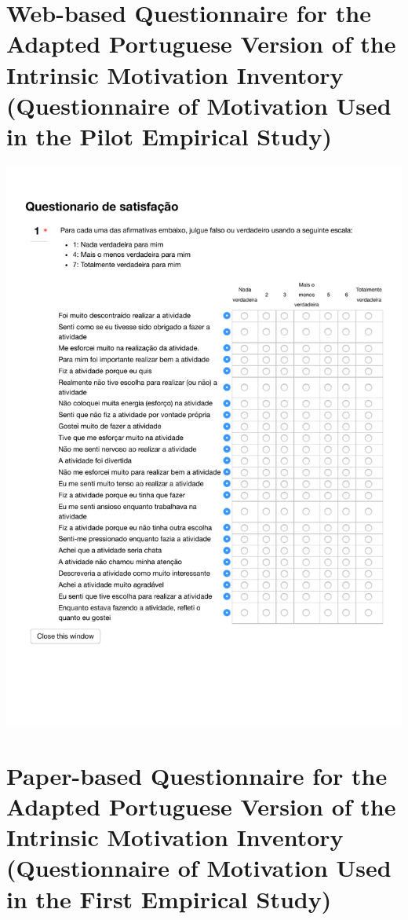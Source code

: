 \chapter[Web-based Questionnaire for the Adapted Portuguese IMI]{Web-based Questionnaire for the Adapted Portuguese Version of the Intrinsic Motivation Inventory (Questionnaire of Motivation Used in the Pilot Empirical Study)}
\label{annex:IMI-pilot-study}
\includegraphics[width=1\textwidth]{images/annex/IMI-pilot-study.pdf}

\chapter[Paper-based Questionnaire for the Adapted Portuguese IMI]{Paper-based Questionnaire for the Adapted Portuguese Version of the Intrinsic Motivation Inventory (Questionnaire of Motivation Used in the First Empirical Study)}
\label{annex:IMI-first-study}

